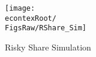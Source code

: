 \begin{figure}[h]
	\centerline{\texttt{[image: \\econtexRoot/\\FigsRaw/RShare\_Sim]}}
	\caption{Risky Share Simulation}
	\label{fig:RShareSim}
\end{figure}
